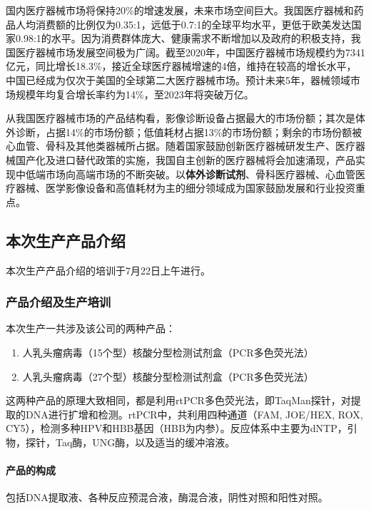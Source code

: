 国内医疗器械市场将保持20\%的增速发展，未来市场空间巨大。我国医疗器械和药品人均消费额的比例仅为0.35:1，远低于0.7:1的全球平均水平，更低于欧美发达国家0.98:1的水平。因为消费群体庞大、健康需求不断增加以及政府的积极支持，我国医疗器械市场发展空间极为广阔。截至2020年，中国医疗器械市场规模约为7341亿元，同比增长18.3\%，接近全球医疗器械增速的4倍，维持在较高的增长水平，中国已经成为仅次于美国的全球第二大医疗器械市场。预计未来5年，器械领域市场规模年均复合增长率约为14\%，至2023年将突破万亿。

从我国医疗器械市场的产品结构看，影像诊断设备占据最大的市场份额；其次是体外诊断，占据14\%的市场份额；低值耗材占据13\%的市场份额；剩余的市场份额被心血管、骨科及其他类器械所占据。随着国家鼓励创新医疗器械研发生产、医疗器械国产化及进口替代政策的实施，我国自主创新的医疗器械将会加速涌现，产品实现中低端市场向高端市场的不断突破。以\textbf{体外诊断试剂}、骨科医疗器械、心血管医疗器械、医学影像设备和高值耗材为主的细分领域成为国家鼓励发展和行业投资重点。

\subsection{本次生产产品介绍}
本次生产产品介绍的培训于7月22日上午进行。

\subsubsection{产品介绍及生产培训} 本次生产一共涉及该公司的两种产品：
\begin{enumerate}
    \item 人乳头瘤病毒（15个型）核酸分型检测试剂盒（PCR多色荧光法）
    \item 人乳头瘤病毒（27个型）核酸分型检测试剂盒（PCR多色荧光法）
\end{enumerate}

这两种产品的原理大致相同，都是利用rtPCR多色荧光法，即TaqMan探针，对提取的DNA进行扩增和检测。rtPCR中，共利用四种通道（FAM, JOE/HEX, ROX, CY5），检测多种HPV和HBB基因（HBB为内参）。反应体系中主要为dNTP，引物，探针，Taq酶，UNG酶，以及适当的缓冲溶液。

\paragraph{产品的构成} 包括DNA提取液、各种反应预混合液，酶混合液，阴性对照和阳性对照。

